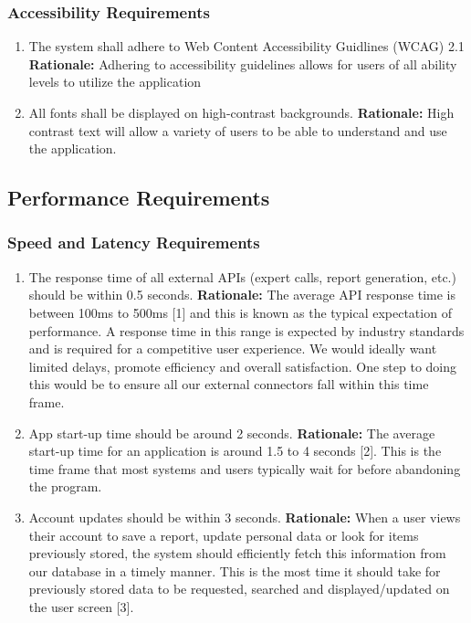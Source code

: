 \documentclass[]{article}
\begin{document}
\subsubsection{Accessibility Requirements}
\label{ssub:accessibility_requirements}
\begin{enumerate}[{UH-A}1. ]
	\item The system shall adhere to Web Content Accessibility Guidlines (WCAG) 2.1
	\newline \textbf{Rationale:} Adhering to accessibility guidelines allows for users of all ability levels to utilize the application
    \item All fonts shall be displayed on high-contrast backgrounds.
    \newline \textbf{Rationale:} High contrast text will allow a variety of users to be able to understand and use the application.
\end{enumerate}

\subsection{Performance Requirements}
\label{sub:performance_requirements}

\subsubsection{Speed and Latency Requirements}
\label{ssub:speed_and_latency_requirements}
\begin{enumerate}[{PR-SL}1. ]
	\item The response time of all external APIs (expert calls, report generation, etc.) should be within 0.5 seconds.
	\newline  \textbf{Rationale:} The average API response time is between 100ms to 500ms [1] and this is known as the typical expectation of performance. A response time in this range is expected by industry standards and is required for a competitive user experience. We would ideally want limited delays, promote efficiency and overall satisfaction. One step to doing this would be to ensure all our external connectors fall within this time frame. 
	\item App start-up time should be around 2 seconds.
	\newline  \textbf{Rationale:} The average start-up time for an application is around 1.5 to 4 seconds [2]. This is the time frame that most systems and users typically wait for before abandoning the program. 
	\item Account updates should be within 3 seconds.
	\newline \textbf{Rationale:} When a user views their account to save a report, update personal data or look for items previously stored, the system should efficiently fetch this information from our database in a timely manner. This is the most time it should take for previously stored data to be requested, searched and displayed/updated on the user screen [3].
\end{enumerate}
\end{document}

